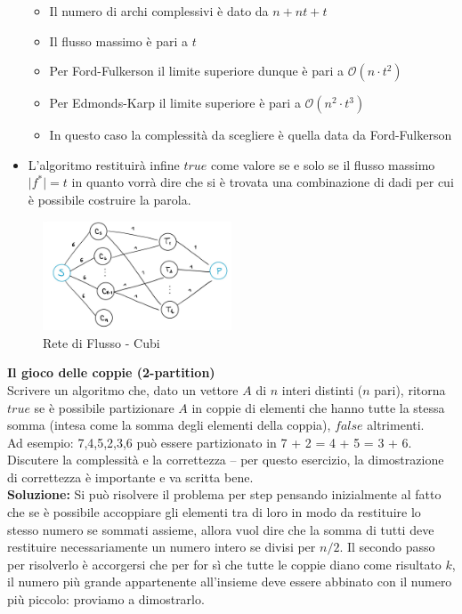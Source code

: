 \documentclass[../cheatSheetAlgoritmi.tex]{subfiles}
\begin{document}
\begin{itemize}
\begin{itemize}
			\item Il numero di archi complessivi è dato da $n + nt + t$
			\item Il flusso massimo è pari a $t$
			\item Per Ford-Fulkerson il limite superiore dunque è pari a $\mathcal{O}(n \cdot t^{2})$
			\item Per Edmonds-Karp il limite superiore è pari a $\mathcal{O}(n^{2} \cdot t^{3})$
			\item In questo caso la complessità da scegliere è quella data da Ford-Fulkerson
		\end{itemize}
		\item L'algoritmo restituirà infine $true$ come valore se e solo se il flusso massimo $\mid f^{*} \mid = t$ in quanto vorrà dire che si è trovata una combinazione di dadi per cui è possibile costruire la parola.\\
\end{itemize}
\begin{figure}[h]
\caption{Rete di Flusso - Cubi}
\centering
\includegraphics[width=0.5\textwidth]{../img/Locale_2.jpg}
\end{figure}
\textbf{Il gioco delle coppie (2-partition)}\\
Scrivere un algoritmo che, dato un vettore $A$ di $n$ interi distinti ($n$ pari), ritorna $true$ se è possibile partizionare $A$ in coppie di elementi che hanno tutte la stessa somma (intesa come la somma degli elementi della coppia), $false$ altrimenti.\\
Ad esempio: 7,4,5,2,3,6 può essere partizionato in 7 + 2 = 4 + 5 = 3 + 6.\\
Discutere la complessità e la correttezza – per questo esercizio, la dimostrazione di correttezza è importante e va scritta bene.\\
\textbf{Soluzione:} Si può risolvere il problema per step pensando inizialmente al fatto che se è possibile accoppiare gli elementi tra di loro in modo da restituire lo stesso numero se sommati assieme, allora vuol dire che la somma di tutti deve restituire necessariamente un numero intero se divisi per $n / 2$. Il secondo passo per risolverlo è accorgersi che per for sì che tutte le coppie diano come risultato $k$, il numero più grande appartenente all'insieme deve essere abbinato con il numero più piccolo: proviamo a dimostrarlo.
\end{document}

